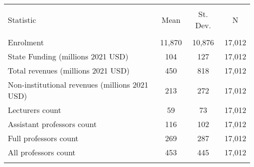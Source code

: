
\begin{tabular}{@{\extracolsep{5pt}}lccc} 
\\[-1.8ex]\hline 
\hline \\[-1.8ex] 
Statistic & \multicolumn{1}{c}{Mean} & \multicolumn{1}{c}{St. Dev.} & \multicolumn{1}{c}{N} \\ 
\hline \\[-1.8ex] 
Enrolment & 11,870 & 10,876 & 17,012 \\ 
State Funding (millions 2021 USD) & 104 & 127 & 17,012 \\ 
Total revenues (millions 2021 USD) & 450 & 818 & 17,012 \\ 
Non-institutional revenues (millions 2021 USD) & 213 & 272 & 17,012 \\ 
Lecturers count & 59 & 73 & 17,012 \\ 
Assistant professors count & 116 & 102 & 17,012 \\ 
Full professors count & 269 & 287 & 17,012 \\ 
All professors count & 453 & 445 & 17,012 \\ 
\hline \\[-1.8ex] 
\end{tabular} 
